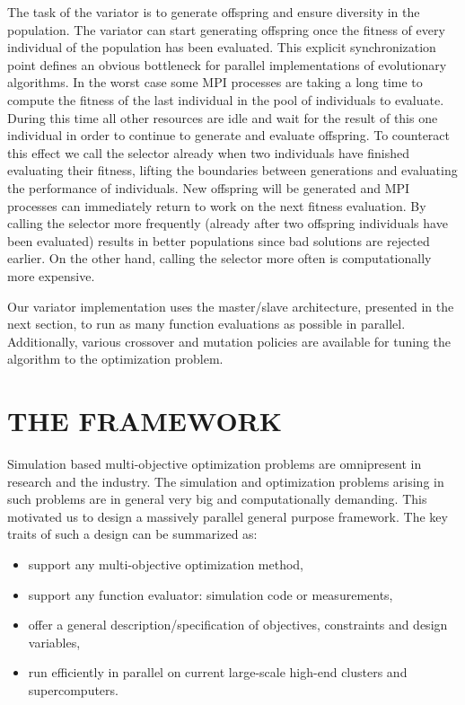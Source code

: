 \documentclass[%
reprint,
amsmath,amssymb,
aps,
prstab,
]{revtex4-1}
\begin{document}
The task of the variator is to generate offspring and ensure diversity in the
  population.
The variator can start generating offspring once the fitness of every
  individual of the population has been evaluated.
This explicit synchronization point defines an obvious bottleneck for parallel
  implementations of evolutionary algorithms.
In the worst case some MPI processes are taking a long time to compute the
  fitness of the last individual in the pool of individuals to evaluate.
During this time all other resources are idle and wait for the result of
  this one individual in order to continue to generate and evaluate offspring.
To counteract this effect we call the selector already when two individuals
  have finished evaluating their fitness, lifting the boundaries between
  generations and evaluating the performance of individuals.
New offspring will be generated and MPI processes can immediately return to
  work on the next fitness evaluation.
By calling the selector more frequently (already after two offspring
  individuals have been evaluated) results in better populations since bad
  solutions are rejected earlier.
On the other hand, calling the selector more often is computationally more
  expensive.

Our variator implementation uses the master/slave architecture, presented in
  the next section, to run as many function evaluations as possible in parallel.
Additionally, various crossover and mutation policies are available for tuning
  the algorithm to the optimization problem.



\section{THE FRAMEWORK} \label{sec:framework}

Simulation based multi-objective optimization problems are omnipresent in
  research and the industry.
The simulation and optimization problems arising in such problems are in
  general very big and computationally demanding.
This motivated us to design a massively parallel general purpose framework.
The key traits of such a design can be summarized as:
%
\begin{itemize}
  \item support any multi-objective optimization method,
  \item support any function evaluator: simulation code or measurements,
  \item offer a general description/specification of objectives, constraints
        and design variables,
  \item run efficiently in parallel on current large-scale high-end clusters
        and supercomputers.
\end{itemize}
%
\end{document}
